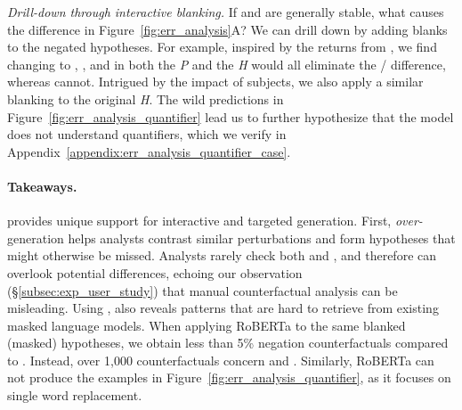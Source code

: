 \emph{Drill-down through interactive blanking.}
If  and  are generally stable, what causes the difference in Figure~\ref{fig:err_analysis}A?
We can drill down by adding blanks to the negated hypotheses.
For example, inspired by the returns from , we find changing  to , , and  in both the \emph{P} and the \emph{H} would all eliminate the / difference, whereas  cannot.
Intrigued by the impact of subjects, we also apply a similar blanking to the original \emph{H}.
The wild predictions in Figure~\ref{fig:err_analysis_quantifier} lead us to further hypothesize that the model does not understand quantifiers, which we verify in Appendix~\ref{appendix:err_analysis_quantifier_case}.


\paragraph{Takeaways.}
\sysname provides unique support for interactive and targeted generation.
First, \emph{over-}generation helps analysts contrast similar perturbations and form hypotheses that might otherwise be missed.
Analysts rarely check both  and , and therefore can overlook potential differences, echoing our observation (\S\ref{subsec:exp_user_study}) that manual counterfactual analysis can be misleading.
Using \tagstrs, \sysname also reveals patterns that are hard to retrieve from existing masked language models.
When applying RoBERTa to the same blanked (masked) hypotheses, we obtain less than 5\% negation counterfactuals compared to \sysname.
Instead, over 1,000 counterfactuals concern  and .
Similarly, RoBERTa can not produce the examples in Figure~\ref{fig:err_analysis_quantifier}, as it focuses on single word replacement.


